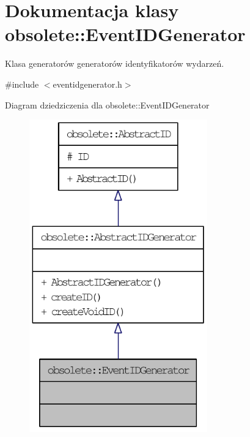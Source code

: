 \hypertarget{classobsolete_1_1EventIDGenerator}{
\section{Dokumentacja klasy obsolete::EventIDGenerator}
\label{classobsolete_1_1EventIDGenerator}
}


Klasa generatorów generatorów identyfikatorów wydarzeń.  




{\ttfamily \#include $<$eventidgenerator.h$>$}



Diagram dziedziczenia dla obsolete::EventIDGenerator\nopagebreak
\begin{figure}[H]
\begin{center}
\leavevmode
\includegraphics[width=218pt]{classobsolete_1_1EventIDGenerator__inherit__graph}
\end{center}
\end{figure}


